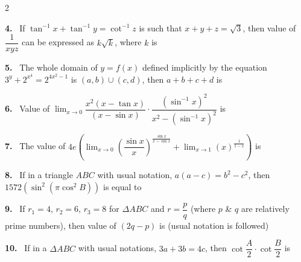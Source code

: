 \documentclass[10pt]{extarticle}
\newcommand{\qn}[1]{\par\smallskip\noindent\textbf{#1.}~}
\begin{document}
\begin{multicols}{2}
\qn{4} If $\tan^{-1}x+\tan^{-1}y=\cot^{-1}z$ is such that $x+y+z=\sqrt3$, then value of $\dfrac1{xyz}$ can be expressed as $k\sqrt k$, where $k$ is
\qn{5} The whole domain of $y=f(x)$ defined implicitly by the equation $3^y+2^{x^4}=2^{4x^2-1}$ is $(a,b)\cup(c,d)$, then $a+b+c+d$ is
\qn{6} Value of $\displaystyle\lim_{x\to0}\dfrac{x^2(x-\tan x)}{(x-\sin x)}\cdot\dfrac{\left(\sin^{-1}x\right)^2}{x^2-\left(\sin^{-1}x\right)^2}$ is
\qn{7} The value of $4e\left(\displaystyle\lim_{x\to0}\left(\dfrac{\sin x}{x}\right)^{\frac{\sin x}{x-\sin x}}+\lim_{x\to1}(x)^{\frac1{1-x}}\right)$ is
\qn{8} If in a triangle $ABC$ with usual notation, $a(a-c)=b^2-c^2$, then $1572(\sin^2(\pi\cos^2B))$ is equal to
\qn{9} If $r_1=4$, $r_2=6$, $r_3=8$ for $\Delta ABC$ and $r=\dfrac pq$ (where $p$ \& $q$ are relatively prime numbers), then value of $(2q-p)$ is (usual notation is followed)
\qn{10} If in a $\Delta ABC$ with usual notations, $3a+3b=4c$, then $\cot\dfrac A2\cdot\cot\dfrac B2$ is
\end{multicols}
\end{document}

